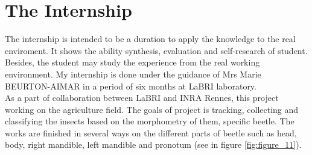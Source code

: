 \section{The Internship}
The internship is intended to be a duration to apply the knowledge to the real enviroment. It shows the ability synthesis, evaluation and self-research of student. Besides, the student may study the experience from the real working environment. My internship is done under the guidance of Mrs Marie BEURTON-AIMAR in a period of six months at LaBRI laboratory.\\[0.2cm]
As a part of collaboration between LaBRI and INRA Rennes, this project working on the agriculture field. The goals of project is tracking, collecting and classifying the insects based on the morphometry of them, specific beetle. The works are finished in several ways on the different parts of beetle such as head, body, right mandible, left mandible and pronotum (see in figure \ref{fig:figure_11}). 
